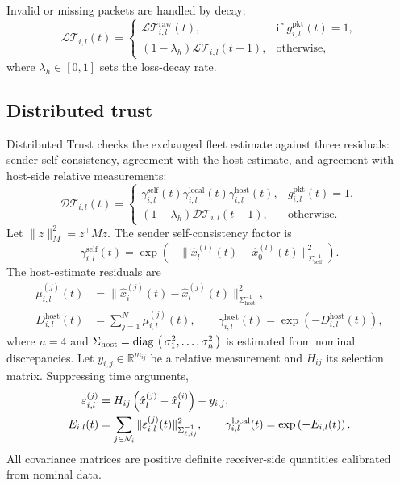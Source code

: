 \documentclass[letterpaper,journal]{IEEEtran}
\def\N{\mathcal{N}} %
\def\diag#1{\mathop{{\rm diag}\,\left(\,#1\,\right)}}
\def\LT{\mathcal{LT}} %
\def\DT{\mathcal{DT}} %
\begin{document}
Invalid or missing packets are handled by decay:
\begin{equation}
    \LT_{i,l}(t) =
    \left\{ \begin{array}{ll}
        \LT_{i,l}^{\mathrm{raw}}(t),  &  \text{if } g_{i,l}^{\mathrm{pkt}}(t) = 1, \\
        (1 - \lambda_h)\LT_{i,l}(t-1), & \text{otherwise,}
    \end{array}\right.
    \label{eq_local_trust_update}
\end{equation}
where $\lambda_h\in[0,1]$ sets the loss-decay rate.

\subsection{Distributed trust}
Distributed Trust checks the exchanged fleet estimate against three residuals: sender self-consistency, agreement with the host estimate, and agreement with host-side relative measurements:
\begin{equation}
        \DT_{i,l}(t)  = \begin{cases}
       \gamma_{i,l}^{\text{self}}(t)\gamma_{i,l}^{\text{local}}(t)
       \gamma_{i,l}^{\text{host}}(t),   &  g_{i,l}^{\mathrm{pkt}}(t) = 1, \\
        (1 - \lambda_h)\DT_{i,l}(t-1), & \text{otherwise}.
    \end{cases}
\end{equation}
Let $\|z\|_M^2=z^\top M z$. The sender self-consistency factor is
\begin{equation}
    \gamma_{i,l}^{\text{self}}(t)
    =
    \exp\left(
    -\|\hat{x}_l^{(l)}(t)-\hat{x}_0^{(l)}(t)\|_{\Sigma_{\text{self}}^{-1}}^2
    \right).
\end{equation}
The host-estimate residuals are
\begin{align}
    \mu_{i,l}^{(j)}(t)
    &=
    \|\hat{x}_i^{(j)}(t)-\hat{x}_l^{(j)}(t)\|_{\Sigma_{\text{host}}^{-1}}^2,
    \label{eq_dis_glo}\\
    D_{i,l}^{\text{host}}(t)
    &=
    \sum_{j=1}^N \mu_{i,l}^{(j)}(t), \qquad
    \gamma_{i,l}^{\text{host}}(t)
    =
    \exp\left(-D_{i,l}^{\text{host}}(t)\right),
\end{align}
where $n=4$ and $\Sigma_{\text{host}}=\diag{\sigma_1^2,\ldots,\sigma_n^2}$ is estimated from nominal discrepancies. Let $y_{i,j}\in\mathbb{R}^{m_{ij}}$ be a relative measurement and $H_{ij}$ its selection matrix. 
Suppressing time arguments,
\begin{align}
    \varepsilon_{i,l}^{(j)}
    &=
    H_{ij}\left(\hat{x}_l^{(j)}-\hat{x}_l^{(i)}\right)-y_{i,j}, \notag\\
    E_{i,l}(t)
    &=
    \sum_{j\in\N_i}
    \|\varepsilon_{i,l}^{(j)}(t)\|_{\Sigma_{\ell,ij}^{-1}}^2,\qquad
    \gamma_{i,l}^{\text{local}}(t)
    =
    \exp\left(-E_{i,l}(t)\right).
\end{align}
All covariance matrices are positive definite receiver-side quantities calibrated from nominal data.
\end{document}
